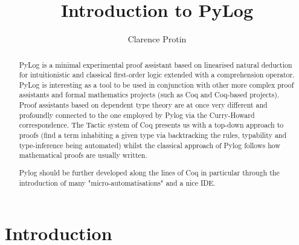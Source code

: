 \documentclass[a4paper,12pt,leqno]{article}
\numberwithin{equation}{section}
\begin{document}
	
	
	
	\title{Introduction to PyLog}
	\author{Clarence Protin}
	
	\maketitle

 \begin{abstract}
 PyLog is a minimal experimental proof assistant based on linearised natural deduction for intuitionistic and classical first-order logic extended with a comprehension operator. PyLog is interesting as a tool to be used in conjunction with other more complex proof assistants and formal mathematics projects (such as Coq and Coq-based projects).
 Proof assistants based on dependent type theory are at once very different and profoundly connected to the one employed by Pylog via the Curry-Howard correspondence. The Tactic system of Coq presents us with a top-down approach to proofs (find  a term inhabiting a given type via backtracking the rules, typability and type-inference being automated) whilst the classical approach of Pylog follows how mathematical proofs are usually written.
 
 Pylog should be further developed along the lines of Coq in particular through the introduction of many "micro-automatisations"  and a nice IDE.
 \end{abstract}
 
 
 \section*{Introduction}
 
\end{document}
